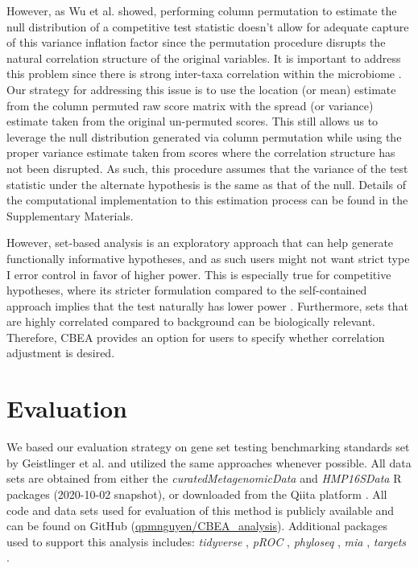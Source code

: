 \documentclass[10pt,letterpaper]{article}
\begin{document}
However, as Wu et al. \cite{wu2012} showed, performing column permutation to estimate the null distribution of a competitive test statistic doesn't allow for adequate capture of this variance inflation factor since the permutation procedure disrupts the natural correlation structure of the original variables. It is important to address this problem since there is strong inter-taxa correlation within the microbiome \cite{kurtz2015a}. Our strategy for addressing this issue is to use the location (or mean) estimate from the column permuted raw score matrix with the spread (or variance) estimate taken from the original un-permuted scores. This still allows us to leverage the null distribution generated via column permutation while using the proper variance estimate taken from scores where the correlation structure has not been disrupted. As such, this procedure assumes that the variance of the test statistic under the alternate hypothesis is the same as that of the null. Details of the computational implementation to this estimation process can be found in the Supplementary Materials.   

However, set-based analysis is an exploratory approach that can help generate functionally informative hypotheses, and as such users might not want strict type I error control in favor of higher power. This is especially true for competitive hypotheses, where its stricter formulation compared to the self-contained approach implies that the test naturally has lower power \cite{goeman2007, ackerman2009}. Furthermore, sets that are highly correlated compared to background can be biologically relevant. Therefore, CBEA provides an option for users to specify whether correlation adjustment is desired. 

\section*{Evaluation} \label{evaluation}
We based our evaluation strategy on gene set testing benchmarking standards set by Geistlinger et al. \cite{geistlinger2021} and utilized the same approaches whenever possible. All data sets are obtained from either the \emph{curatedMetagenomicData} \cite{pasolli2017} and \emph{HMP16SData} \cite{schiffer2019} R packages (2020-10-02 snapshot), or downloaded from the Qiita platform \cite{gonzalez2018}. All code and data sets used for evaluation of this method is publicly available and can be found on GitHub (\href{www.github.com/qpmnguyen/CBEA\_analysis}{qpmnguyen/CBEA\_analysis}). Additional packages used to support this analysis includes: \emph{tidyverse} \cite{wickham2019}, \emph{pROC} \cite{robin2011}, \emph{phyloseq} \cite{mcmurdie2014}, \emph{mia} \cite{ernst2021}, \emph{targets} \cite{landau2021}.   
\end{document}
